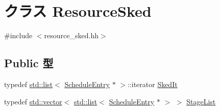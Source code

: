 \hypertarget{classResourceSked}{
\section{クラス ResourceSked}
\label{classResourceSked}
}


{\ttfamily \#include $<$resource\_\-sked.hh$>$}\subsection*{Public 型}
\begin{DoxyCompactItemize}
\item 
typedef \hyperlink{classstd_1_1list}{std::list}$<$ \hyperlink{classScheduleEntry}{ScheduleEntry} $\ast$ $>$::iterator \hyperlink{classResourceSked_ab2a9eec675af76477619cacd99ea5225}{SkedIt}
\item 
typedef \hyperlink{classstd_1_1vector}{std::vector}$<$ \hyperlink{classstd_1_1list}{std::list}$<$ \hyperlink{classScheduleEntry}{ScheduleEntry} $\ast$ $>$ $>$ \hyperlink{classResourceSked_acd54846efdfb59f7183a9ecc11ebdbdb}{StageList}
\end{DoxyCompactItemize}
